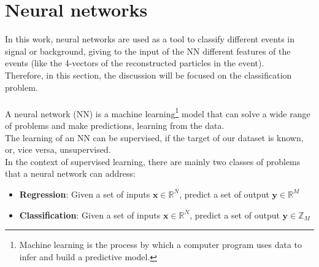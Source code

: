 \label{sec:STAT}
\vspace{-1cm}
\minitoc
\section{Neural networks}\label{sec:NN}
In this work, neural networks are used as a tool to classify different events in signal or background, giving to the input of the NN different features of the events (like the 4-vectors of the reconstructed particles in the event). \\Therefore, in this section, the discussion will be focused on the classification problem.\\
\\
A neural network (NN) is a machine learning\footnote{Machine learning is the process by which a computer program uses data to infer and build a predictive model.} model that can solve a wide range of problems and make predictions, learning from the data.\\
The learning of an NN can be supervised, if the target of our dataset is known, or, vice versa, unsupervised.\\
In the context of supervised learning, there are mainly two classes of problems that a neural network can address:
\begin{itemize}
    \item \textbf{Regression}: Given a set of inputs $\bm{x} \in \mathbb{R}^N$, predict a set of output $\bm{y} \in \mathbb{R}^M$
    \item \textbf{Classification}: Given a set of inputs $\bm{x} \in \mathbb{R}^N$, predict a set of output $\bm{y} \in \mathbb{Z}_M$
\end{itemize}


